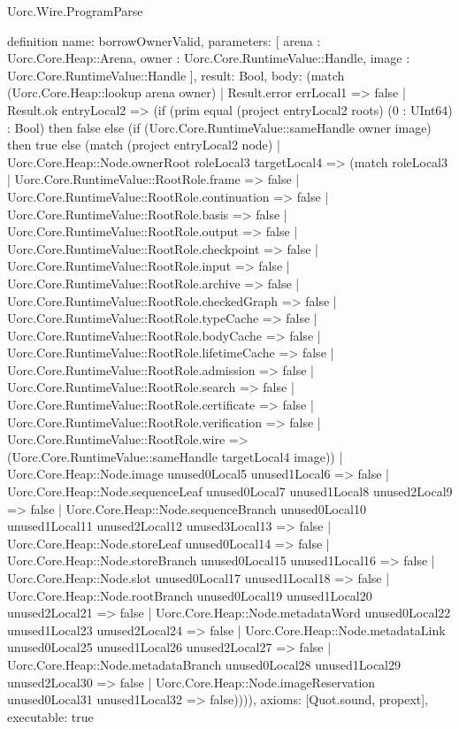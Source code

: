\begin{lexlean}{Uorc.Wire.ProgramParse}
\begin{semanticmodule}
definition{
  name: borrowOwnerValid,
  parameters: [
    arena : Uorc.Core.Heap::Arena,
    owner : Uorc.Core.RuntimeValue::Handle,
    image : Uorc.Core.RuntimeValue::Handle
  ],
  result: Bool,
  body: (match (Uorc.Core.Heap::lookup arena owner)
    | Result.error errLocal1 => false
    | Result.ok entryLocal2 => (if (prim equal (project entryLocal2 roots) (0 : UInt64) : Bool) then false else (if (Uorc.Core.RuntimeValue::sameHandle owner image) then true else (match (project entryLocal2 node)
      | Uorc.Core.Heap::Node.ownerRoot roleLocal3 targetLocal4 => (match roleLocal3
        | Uorc.Core.RuntimeValue::RootRole.frame => false
        | Uorc.Core.RuntimeValue::RootRole.continuation => false
        | Uorc.Core.RuntimeValue::RootRole.basis => false
        | Uorc.Core.RuntimeValue::RootRole.output => false
        | Uorc.Core.RuntimeValue::RootRole.checkpoint => false
        | Uorc.Core.RuntimeValue::RootRole.input => false
        | Uorc.Core.RuntimeValue::RootRole.archive => false
        | Uorc.Core.RuntimeValue::RootRole.checkedGraph => false
        | Uorc.Core.RuntimeValue::RootRole.typeCache => false
        | Uorc.Core.RuntimeValue::RootRole.bodyCache => false
        | Uorc.Core.RuntimeValue::RootRole.lifetimeCache => false
        | Uorc.Core.RuntimeValue::RootRole.admission => false
        | Uorc.Core.RuntimeValue::RootRole.search => false
        | Uorc.Core.RuntimeValue::RootRole.certificate => false
        | Uorc.Core.RuntimeValue::RootRole.verification => false
        | Uorc.Core.RuntimeValue::RootRole.wire => (Uorc.Core.RuntimeValue::sameHandle targetLocal4 image))
      | Uorc.Core.Heap::Node.image unused0Local5 unused1Local6 => false
      | Uorc.Core.Heap::Node.sequenceLeaf unused0Local7 unused1Local8 unused2Local9 => false
      | Uorc.Core.Heap::Node.sequenceBranch unused0Local10 unused1Local11 unused2Local12 unused3Local13 => false
      | Uorc.Core.Heap::Node.storeLeaf unused0Local14 => false
      | Uorc.Core.Heap::Node.storeBranch unused0Local15 unused1Local16 => false
      | Uorc.Core.Heap::Node.slot unused0Local17 unused1Local18 => false
      | Uorc.Core.Heap::Node.rootBranch unused0Local19 unused1Local20 unused2Local21 => false
      | Uorc.Core.Heap::Node.metadataWord unused0Local22 unused1Local23 unused2Local24 => false
      | Uorc.Core.Heap::Node.metadataLink unused0Local25 unused1Local26 unused2Local27 => false
      | Uorc.Core.Heap::Node.metadataBranch unused0Local28 unused1Local29 unused2Local30 => false
      | Uorc.Core.Heap::Node.imageReservation unused0Local31 unused1Local32 => false)))),
  axioms: [Quot.sound, propext],
  executable: true
}


\end{semanticmodule}
\end{lexlean}
